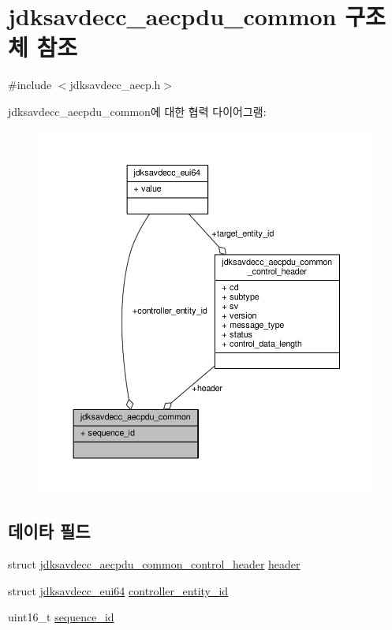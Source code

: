 \hypertarget{structjdksavdecc__aecpdu__common}{}\section{jdksavdecc\+\_\+aecpdu\+\_\+common 구조체 참조}
\label{structjdksavdecc__aecpdu__common}


{\ttfamily \#include $<$jdksavdecc\+\_\+aecp.\+h$>$}



jdksavdecc\+\_\+aecpdu\+\_\+common에 대한 협력 다이어그램\+:
\nopagebreak
\begin{figure}[H]
\begin{center}
\leavevmode
\includegraphics[width=350pt]{structjdksavdecc__aecpdu__common__coll__graph}
\end{center}
\end{figure}
\subsection*{데이타 필드}
\begin{DoxyCompactItemize}
\item 
struct \hyperlink{structjdksavdecc__aecpdu__common__control__header}{jdksavdecc\+\_\+aecpdu\+\_\+common\+\_\+control\+\_\+header} \hyperlink{structjdksavdecc__aecpdu__common_a314cacb6a61bcf18749030c0b6fb7510}{header}
\item 
struct \hyperlink{structjdksavdecc__eui64}{jdksavdecc\+\_\+eui64} \hyperlink{structjdksavdecc__aecpdu__common_affc928ddb4fc62d1d04a775d36e5f2c8}{controller\+\_\+entity\+\_\+id}
\item 
uint16\+\_\+t \hyperlink{structjdksavdecc__aecpdu__common_a8f184eb7c16a6d3a501c383ee8ffa200}{sequence\+\_\+id}
\end{DoxyCompactItemize}


